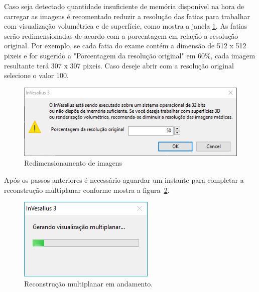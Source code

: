 Caso seja detectado quantidade insuficiente de memória disponível na hora de carregar as imagens é recomentado  reduzir a resolução das fatias para trabalhar com visualização volumétrica e de superfície, como mostra a janela \ref{fig:import_bmp_resize_pt}.  As fatias serão redimensionadas de acordo com a porcentagem em relação a resolução original. Por exemplo,  se cada fatia do exame contém a dimensão de 512 x 512 pixeis e for sugerido a "Porcentagem da resolução original" em 60\%, cada imagem resultante terá 307 x 307 pixeis. Caso deseje abrir com a resolução original selecione o valor 100.

\begin{figure}[!htb]
\centering
\includegraphics[scale=0.5]{../user_guide_figures/invesalius_screen/import_bmp_resize_pt.png}
\caption{Redimensionamento de imagens}
\label{fig:import_bmp_resize_pt}
\end{figure}


Após os passos anteriores é necessário aguardar um instante para completar a reconstrução multiplanar conforme mostra a figura~\ref{fig:import_bmp_mpr_pt.png}.

\begin{figure}[!htb]
\centering
\includegraphics[scale=0.6]{../user_guide_figures/invesalius_screen/import_bmp_mpr_pt.png}
\caption{Reconstrução multiplanar em andamento.}
\label{fig:import_bmp_mpr_pt.png}
\end{figure}
